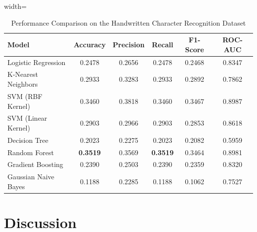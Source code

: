 \documentclass[12pt,a4paper]{article}
\begin{document}
\begin{table}[H]
\centering
\caption{Performance Comparison on the Handwritten Character Recognition Dataset}
\label{tab:handwritten_results}

\renewcommand{\arraystretch}{1.2}

\begin{adjustbox}{width=\textwidth}
\begin{tabular}{|l|c|c|c|c|c|}

\toprule

\textbf{Model}
&
\textbf{Accuracy}
&
\textbf{Precision}
&
\textbf{Recall}
&
\textbf{F1-Score}
&
\textbf{ROC-AUC}

\\

\midrule

Logistic Regression
&
0.2478
&
0.2656
&
0.2478
&
0.2468
&
0.8347
\\

K-Nearest Neighbors
&
0.2933
&
0.3283
&
0.2933
&
0.2892
&
0.7862
\\

SVM (RBF Kernel)
&
0.3460
&
0.3818
&
0.3460
&
0.3467
&
0.8987
\\

SVM (Linear Kernel)
&
0.2903
&
0.2966
&
0.2903
&
0.2853
&
0.8618
\\

Decision Tree
&
0.2023
&
0.2275
&
0.2023
&
0.2082
&
0.5959
\\

Random Forest
&
\textbf{0.3519}
&
0.3569
&
\textbf{0.3519}
&
0.3464
&
0.8981
\\

Gradient Boosting
&
0.2390
&
0.2503
&
0.2390
&
0.2359
&
0.8320
\\

Gaussian Naive Bayes
&
0.1188
&
0.2285
&
0.1188
&
0.1062
&
0.7527
\\

\bottomrule

\end{tabular}
\end{adjustbox}

\end{table}

\section{Discussion}
\end{document}
